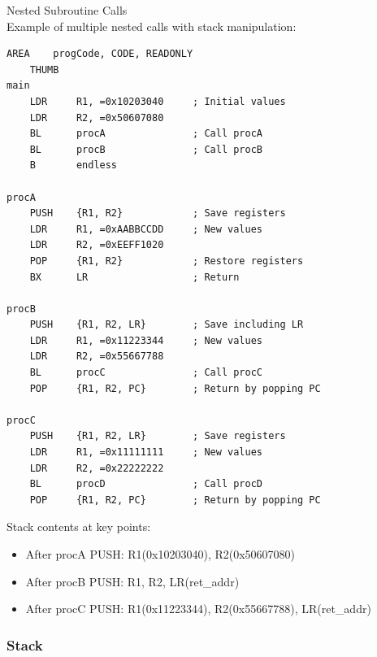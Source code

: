 \begin{example2}{Nested Subroutine Calls}\\
Example of multiple nested calls with stack manipulation:
\begin{lstlisting}[language=armasm, style=basesmol]
    AREA    progCode, CODE, READONLY
    THUMB
main
    LDR     R1, =0x10203040     ; Initial values
    LDR     R2, =0x50607080
    BL      procA               ; Call procA
    BL      procB               ; Call procB
    B       endless

procA
    PUSH    {R1, R2}            ; Save registers
    LDR     R1, =0xAABBCCDD     ; New values
    LDR     R2, =0xEEFF1020
    POP     {R1, R2}            ; Restore registers
    BX      LR                  ; Return

procB
    PUSH    {R1, R2, LR}        ; Save including LR
    LDR     R1, =0x11223344     ; New values
    LDR     R2, =0x55667788
    BL      procC               ; Call procC
    POP     {R1, R2, PC}        ; Return by popping PC

procC
    PUSH    {R1, R2, LR}        ; Save registers
    LDR     R1, =0x11111111     ; New values
    LDR     R2, =0x22222222
    BL      procD               ; Call procD
    POP     {R1, R2, PC}        ; Return by popping PC
\end{lstlisting}

Stack contents at key points:
\begin{itemize}
  \item After procA PUSH: R1(0x10203040), R2(0x50607080)
  \item After procB PUSH: R1, R2, LR(ret\_addr)
  \item After procC PUSH: R1(0x11223344), R2(0x55667788), LR(ret\_addr)
\end{itemize}
\end{example2}



\subsubsection{Stack}

